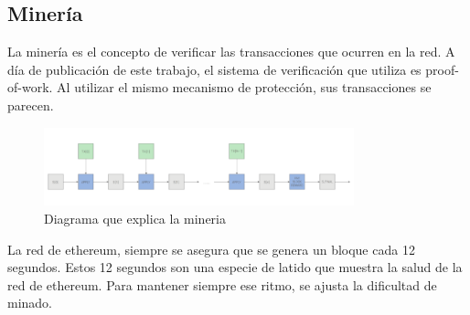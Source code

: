 \subsection*{Minería}
La minería es el concepto de verificar las transacciones que ocurren en la red. A día de publicación de este trabajo, el sistema de verificación que utiliza es proof-of-work. Al utilizar el mismo mecanismo de protección, sus transacciones se parecen.
\begin{figure}[h!]
    \centering
    \includegraphics[width=0.8\textwidth]{Figures/Screenshot_20220507_131504.png}
    \caption{Diagrama que explica la mineria}
    \label{fg:block_diagram}
\end{figure}
La red de ethereum, siempre se asegura que se genera un bloque cada 12 segundos.
Estos 12 segundos son una especie de latido que muestra la salud de la red de ethereum. Para mantener siempre ese ritmo, se ajusta la dificultad de minado.
